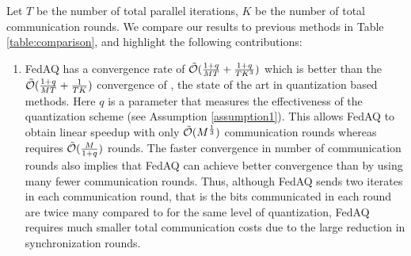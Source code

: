 \documentclass[11pt]{article}
\begin{document}
 Let $T$ be the number of total parallel iterations, $K$ be the number of total communication rounds. We compare our results to previous methods in Table \ref{table:comparison}, and highlight the following contributions:
 \begin{enumerate}

     \item FedAQ has a convergence rate of $\Tilde{\mathcal{O}}(\frac{1+q}{MT}+\frac{1+q}{TK^3})$ which is better than the $\Tilde{\mathcal{O}}(\frac{1+q}{MT}+\frac{1}{TK})$ convergence of \cite{Yeojoon-haddadpour2021federated}, the state of the art in quantization based methods. Here $q$ is a parameter that measures the effectiveness of the quantization scheme (see Assumption \ref{assumption1}). This allows FedAQ to obtain linear speedup with only $\Tilde{\mathcal{O}}(M^{\frac{1}{3}})$ communication rounds whereas \cite{Yeojoon-haddadpour2021federated} requires $\Tilde{\mathcal{O}}(\frac{M}{1+q})$ rounds. The faster convergence in number of communication rounds also implies that FedAQ can achieve better convergence than \cite{Yeojoon-haddadpour2021federated} by using many fewer communication rounds. Thus, although FedAQ sends two iterates in each communication round, that is the bits communicated in each round are twice many compared to \cite{Yeojoon-haddadpour2021federated} for the same level of quantization, FedAQ requires much smaller total communication costs due to the large reduction in synchronization rounds.



\end{enumerate}
\end{document}
